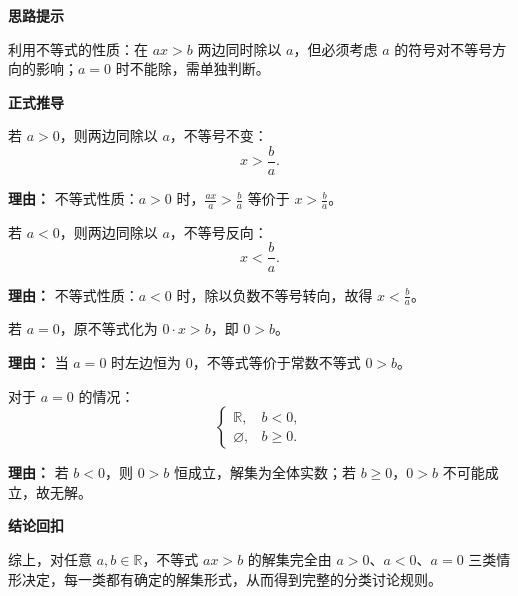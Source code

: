 \begin{proofbox}

	\textbf{\textcolor{CProof}{思路提示}}

	利用不等式的性质：在 $ax>b$ 两边同时除以 $a$，但必须考虑 $a$ 的符号对不等号方向的影响；$a=0$ 时不能除，需单独判断。

	\medskip
	\textbf{\textcolor{CProof}{正式推导}}
	\begin{description}[style=nextline, leftmargin=2.8em, labelsep=0.5em, itemsep=0.55em]
		\item[\textbf{步骤一（正系数情形）：}] 若 $a>0$，则两边同除以 $a$，不等号不变：
			\[
				x > \frac{b}{a}.
			\]
			\par\textbf{理由：} 不等式性质：$a>0$ 时，$\frac{ax}{a} > \frac{b}{a}$ 等价于 $x > \frac{b}{a}$。
		\item[\textbf{步骤二（负系数情形）：}] 若 $a<0$，则两边同除以 $a$，不等号反向：
			\[
				x < \frac{b}{a}.
			\]
			\par\textbf{理由：} 不等式性质：$a<0$ 时，除以负数不等号转向，故得 $x<\frac{b}{a}$。
		\item[\textbf{步骤三（零系数退化）：}] 若 $a=0$，原不等式化为 $0 \cdot x > b$，即 $0 > b$。
			\par\textbf{理由：} 当 $a=0$ 时左边恒为 $0$，不等式等价于常数不等式 $0>b$。
		\item[\textbf{步骤四（零系数细分）：}] 对于 $a=0$ 的情况：
			\[
				\begin{cases}
					\mathbb{R}, & b<0,\\
					\varnothing, & b\ge 0.
			\end{cases}
			\]
			\par\textbf{理由：} 若 $b<0$，则 $0>b$ 恒成立，解集为全体实数；若 $b\ge 0$，$0>b$ 不可能成立，故无解。
	\end{description}

	\medskip
	\textbf{\textcolor{CProof}{结论回扣}}

	综上，对任意 $a,b\in\mathbb{R}$，不等式 $ax>b$ 的解集完全由 $a>0$、$a<0$、$a=0$ 三类情形决定，每一类都有确定的解集形式，从而得到完整的分类讨论规则。

\end{proofbox}
